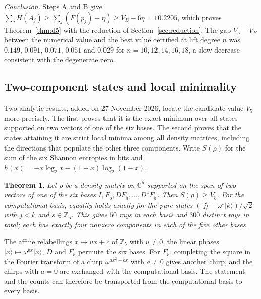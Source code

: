 \documentclass[11pt,a4paper]{article}
\newtheorem{theorem}{Theorem}
\theoremstyle{plain}
\newenvironment{statementframe}{%
  \par\addvspace{0.55\baselineskip}\noindent
  \begingroup\setlength{\fboxrule}{0.3pt}\setlength{\fboxsep}{7pt}%
  \begin{lrbox}{\statementbox}%
  \begin{minipage}{\dimexpr\linewidth-2\fboxsep-2\fboxrule\relax}%
}{%
  \end{minipage}\end{lrbox}%
  {\color{black!45}\fbox{\color{black}\usebox{\statementbox}}}%
  \endgroup\par\addvspace{0.45\baselineskip}%
}
\newcommand{\C}{\mathbb C}
\newcommand{\Z}{\mathbb Z}
\newcommand{\ket}[1]{\lvert#1\rangle}
\begin{document}
\emph{Conclusion.} Steps A and B give
$\sum_jH(A_j)\ge\sum_j(F(p_j)-\eta)\ge V_B-6\eta=10.2205$, which proves
Theorem~\ref{thm:d5} with the reduction of Section~\ref{sec:reduction}. The gap
$V_5-V_B$ between the numerical value and the best value certified at lift
degree $n$ was $0.149$, $0.091$, $0.071$, $0.051$ and $0.029$ for
$n=10,12,14,16,18$, a slow decrease consistent with the degenerate zero.

\subsection{Two-component states and local minimality}\label{sec:d5two}

Two analytic results, added on 27 November 2026, locate the candidate value
$V_5$ more precisely. The first proves that it is the exact minimum over all
states supported on two vectors of one of the six bases. The second proves
that the states attaining it are strict local minima among all density
matrices, including the directions that populate the other three components.
Write $S(\rho)$ for the sum of the six Shannon entropies in bits and
$h(x)=-x\log_2x-(1-x)\log_2(1-x)$.

\begin{statementframe}
\begin{theorem}\label{thm:d5two}
Let $\rho$ be a density matrix on $\C^5$ supported on the span of two vectors
of one of the six bases $I,F_5,DF_5,\dots,D^4F_5$. Then $S(\rho)\ge V_5$.
For the computational basis, equality holds exactly for the pure states
$(\ket j-\omega^s\ket k)/\sqrt2$ with $j<k$ and $s\in\Z_5$. This gives $50$
rays in each basis and $300$ distinct rays in total; each has exactly four
nonzero components in each of the five other bases.
\end{theorem}
\end{statementframe}

The affine relabellings $x\mapsto ux+c$ of $\Z_5$ with $u\ne0$, the linear
phases $\ket x\mapsto\omega^{bx}\ket x$, $D$ and $F_5$ permute the six bases.
For $F_5$, completing the square in the Fourier transform of a chirp
$\omega^{ax^2+bx}$ with $a\ne0$ gives another chirp, and the chirps with $a=0$
are exchanged with the computational basis. The statement and the counts can
therefore be transported from the computational basis to every basis.
\end{document}
